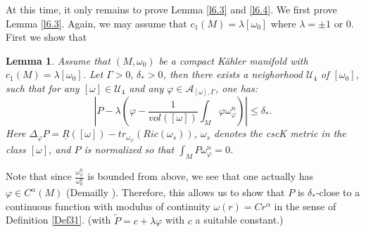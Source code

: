 \documentclass[11pt]{amsart}
\newtheorem{lem}{Lemma}[section]
\numberwithin{equation}{section}
\begin{document}
At this time,  it only remains to prove Lemma \ref{l6.3} and \ref{l6.4}. We first prove Lemma \ref{l6.3}.  Again,  we may assume that $c_1(M)=\lambda[\omega_0]$ where $\lambda=\pm 1$ or 0.  
First we show that
\begin{lem}\label{l6.5}
Assume that $(M,\omega_0)$ be a compact K\"ahler manifold with $c_1(M)=\lambda[\omega_0]$.   
Let $\Gamma>0,\,\delta_*>0$,  then there exists a neighorhood $\mathcal{U}_4$ of $[\omega_0]$,  such that for any $[\omega]\in \mathcal{U}_4$ and any $\varphi\in \mathcal{A}_{[\omega],\Gamma}$,  one has:
\begin{equation*}
|P-\lambda(\varphi-\frac{1}{vol([\omega])}\int_M\varphi\omega_{\varphi}^n)|\le \delta_*.
\end{equation*}
Here $\Delta_{\varphi}P=\underline{R}([\omega])-tr_{\omega_{\varphi}}(Ric(\omega_s))$,  $\omega_s$ denotes the cscK metric in the class $[\omega]$,  and $P$ is normalized so that $\int_MP\omega_{\varphi}^n=0$.
\end{lem}
Note that since $\frac{\omega_{\varphi}^n}{\omega_0^n}$ is bounded from above,  we see that one actually has $\varphi\in C^{\alpha}(M)$ (Demailly \cite{DDGH2008}).  Therefore,  this allows us to show that $P$ is $\delta_*$-close to a continuous function with modulus of continuity $\omega(r)=Cr^{\alpha}$ in the sense of Definition \ref{Def31}.  (with $\tilde{P}=c+\lambda\varphi$ with $c$ a suitable constant.)
\end{document}

